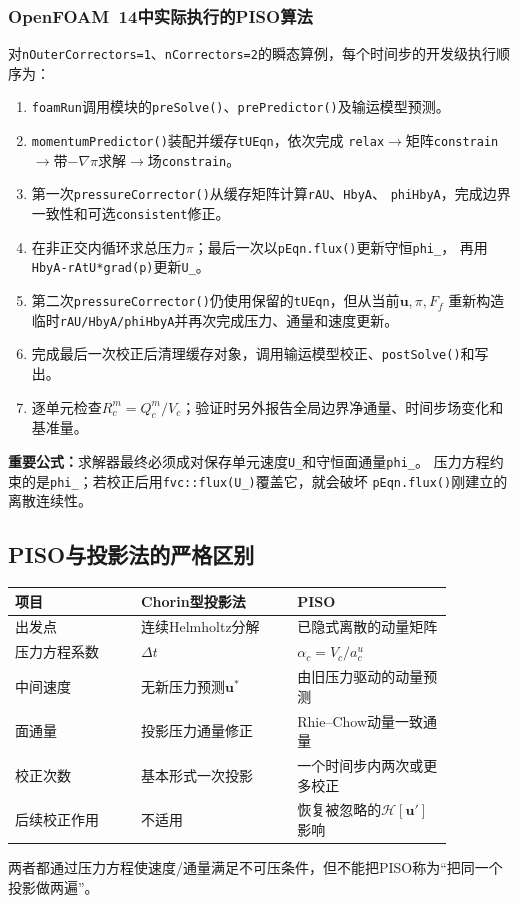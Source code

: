 \documentclass[UTF8,12pt,a4paper]{ctexart}
\numberwithin{equation}{section}
\newcommand{\dt}{\Delta t}
\newcommand{\keytitle}[1]{\par\smallskip\noindent\colorbox{keybg}{%
  \parbox{0.965\linewidth}{\color{keyblue}\textbf{重要公式：}#1}}\par\smallskip}
\begin{document}
\subsubsection{OpenFOAM~14中实际执行的PISO算法}
对\texttt{nOuterCorrectors=1}、\texttt{nCorrectors=2}的瞬态算例，每个时间步的开发级执行顺序为：
\begin{enumerate}
  \item \texttt{foamRun}调用模块的\texttt{preSolve()}、\texttt{prePredictor()}及输运模型预测。
  \item \texttt{momentumPredictor()}装配并缓存\texttt{tUEqn}，依次完成
  \texttt{relax}$\to$矩阵\texttt{constrain}$\to$带$-\nabla\pi$求解$\to$场\texttt{constrain}。
  \item 第一次\texttt{pressureCorrector()}从缓存矩阵计算\texttt{rAU}、\texttt{HbyA}、
  \texttt{phiHbyA}，完成边界一致性和可选\texttt{consistent}修正。
  \item 在非正交内循环求总压力$\pi$；最后一次以\texttt{pEqn.flux()}更新守恒\texttt{phi\_}，
  再用\texttt{HbyA-rAtU*grad(p)}更新\texttt{U\_}。
  \item 第二次\texttt{pressureCorrector()}仍使用保留的\texttt{tUEqn}，但从当前$\bm u,\pi,F_f$
  重新构造临时\texttt{rAU/HbyA/phiHbyA}并再次完成压力、通量和速度更新。
  \item 完成最后一次校正后清理缓存对象，调用输运模型校正、\texttt{postSolve()}和写出。
  \item 逐单元检查$R_c^m=Q_c^m/V_c$；验证时另外报告全局边界净通量、时间步场变化和基准量。
\end{enumerate}

\keytitle{求解器最终必须成对保存单元速度\texttt{U\_}和守恒面通量\texttt{phi\_}。
压力方程约束的是\texttt{phi\_}；若校正后用\texttt{fvc::flux(U\_)}覆盖它，就会破坏
\texttt{pEqn.flux()}刚建立的离散连续性。}

\subsection{PISO与投影法的严格区别}
\begin{longtable}{p{0.25\linewidth}p{0.31\linewidth}p{0.31\linewidth}}
\toprule
项目 & Chorin型投影法 & PISO\\
\midrule
出发点 & 连续Helmholtz分解 & 已隐式离散的动量矩阵\\
压力方程系数 & $\dt$ & $\alpha_c=V_c/a_c^u$\\
中间速度 & 无新压力预测$\bm u^*$ & 由旧压力驱动的动量预测\\
面通量 & 投影压力通量修正 & Rhie--Chow动量一致通量\\
校正次数 & 基本形式一次投影 & 一个时间步内两次或更多校正\\
后续校正作用 & 不适用 & 恢复被忽略的$\mathcal H[\bm u']$影响\\
\bottomrule
\end{longtable}
两者都通过压力方程使速度/通量满足不可压条件，但不能把PISO称为“把同一个投影做两遍”。
\end{document}
